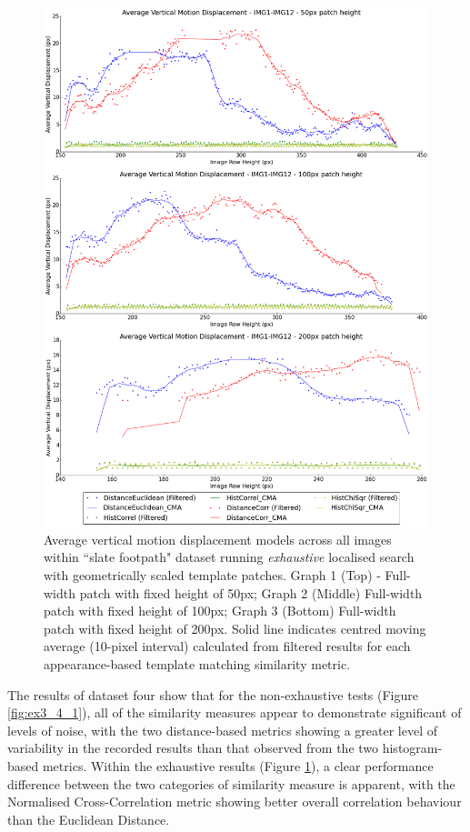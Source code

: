 \clearpage
\begin{figure}[ht!]
\centering
\includegraphics[scale=0.3]{images/results/path_outside_10cm_scaled_exhaustive}
\caption{Average vertical motion displacement models across all images within ``slate footpath" dataset running \textit{exhaustive} localised search with geometrically scaled template patches. Graph 1 (Top) - Full-width patch with fixed height of 50px; Graph 2 (Middle) Full-width patch with fixed height of 100px; Graph 3 (Bottom) Full-width patch with fixed height of 200px. Solid line indicates centred moving average (10-pixel interval) calculated from filtered results for each appearance-based template matching similarity metric.}
\label{fig:ex3_4_2}
\end{figure}

The results of dataset four show that for the non-exhaustive tests (Figure \ref{fig:ex3_4_1}), all of the similarity measures appear to demonstrate significant of levels of noise, with the two distance-based metrics showing a greater level of variability in the recorded results than that observed from the two histogram-based metrics. Within the exhaustive results (Figure \ref{fig:ex3_4_2}), a clear performance difference between the two categories of similarity measure is apparent, with the Normalised Cross-Correlation metric showing better overall correlation behaviour than the Euclidean Distance.


